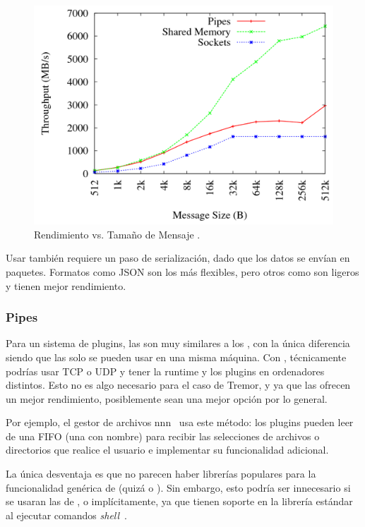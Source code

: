 \begin{figure}
    \centering
    \includegraphics[width=12cm]{./Imagenes/venkataraman2015evaluation2.png}
    \caption{Rendimiento vs. Tamaño de Mensaje
    \cite{venkataraman2015evaluation}.}%
    \label{fig:ipc_comparison2}
\end{figure}

Usar \sockets también requiere un paso de serialización, dado que los datos se
envían en paquetes. Formatos como JSON son los más flexibles, pero otros como
 son ligeros y tienen mejor rendimiento.

\subsubsection{Pipes}

Para un sistema de plugins, las \pipes son muy similares a los \sockets, con la
única diferencia siendo que las \pipes solo se pueden usar en una misma máquina.
Con \sockets, técnicamente podrías usar TCP o UDP y tener la runtime y los
plugins en ordenadores distintos. Esto no es algo necesario para el caso de
Tremor, y ya que las \pipes ofrecen un mejor rendimiento, posiblemente sean una
mejor opción por lo general.

Por ejemplo, el gestor de archivos nnn~\cite{nnn} usa este método: los plugins
pueden leer de una FIFO (una \pipe con nombre) para recibir las selecciones de
archivos o directorios que realice el usuario e implementar su funcionalidad
adicional.

La única desventaja es que no parecen haber librerías populares para la
funcionalidad genérica de \pipes (quizá  o
). Sin embargo, esto podría ser innecesario si se usaran las
\pipes de \stdin, \stdout o \stderr implícitamente, ya que tienen soporte en la
librería estándar al ejecutar comandos \emph{shell}~\cite[Pipes]{rustexample}.

